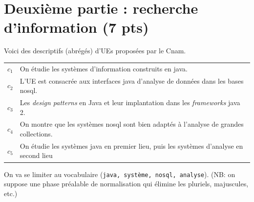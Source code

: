 \documentclass[11pt,a4paper]{article}
\begin{document}
\section*{Deuxième partie : recherche d'information (7 pts)}

Voici des descriptifs (abrégés) d'UEs proposées par le Cnam.

\vspace*{0.3cm}


\begin{tabular}{lp{15cm}}
     $c_1$& On étudie les systèmes d'information construits en java.\\
     $c_2$&  L'UE est consacrée aux interfaces java d'analyse de données dans les bases nosql.\\
     $c_3$& Les \textit{design patterns} en Java et leur implantation dans les \textit{frameworks} java 2.\\
     $c_4$& On montre que les systèmes nosql sont bien adaptés à l'analyse de grandes collections.\\
     $c_5$& On étudie les systèmes java en premier lieu, puis les systèmes d'analyse en second lieu\\ 
\end{tabular}

\bigskip

On va se limiter au vocabulaire (\texttt{java, système, nosql, analyse}).
(NB: on suppose
     une phase préalable de normalisation qui élimine les pluriels, majuscules, etc.)
\end{document}
